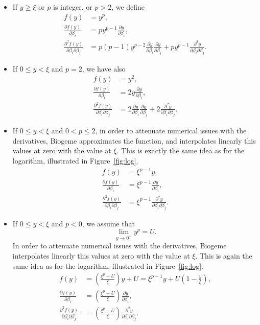 \documentclass[12pt,a4paper]{article}
\begin{document}
\begin{description}
\begin{itemize}
\item If $y \geq \xi$ or $p$ is integer, or $p > 2$, we define
      \begin{align*}
    f(y)& = y^p, \\ 
    \frac{\partial f(y)}{\partial \beta_i} &= p y^{p-1} \frac{\partial y}{\partial \beta_i}, \\
    \frac{\partial^2 f(y)}{\partial \beta_i \partial \beta_j} &= p (p-1) y^{p-2} \frac{\partial y}{\partial \beta_i} \frac{\partial y}{\partial \beta_j} +  p y^{p-1} \frac{\partial^2 y}{\partial \beta_i \partial \beta_j}.
     \end{align*}
\item If $0 \leq y < \xi$ and $p = 2$, we have also
      \begin{align*}
    f(y)& = y^2, \\ 
    \frac{\partial f(y)}{\partial \beta_i} &= 2 y \frac{\partial y}{\partial \beta_i}, \\
    \frac{\partial^2 f(y)}{\partial \beta_i \partial \beta_j} &= 2  \frac{\partial y}{\partial \beta_i} \frac{\partial y}{\partial \beta_j} +  2 \frac{\partial^2 y}{\partial \beta_i \partial \beta_j}.
    \end{align*}
\item If $0 \leq y < \xi$ and $0 < p  \leq 2$, in order to attenuate numerical issues with the derivatives, Biogeme approximates the function, and interpolates linearly this values at zero with the value at  $\xi$.
This is exactly the same idea as for the logarithm,  illustrated in Figure~\vref{fig:log}.
      \begin{align*}
    f(y)& = \xi^{p-1} y, \\ 
    \frac{\partial f(y)}{\partial \beta_i} &= \xi^{p-1} \frac{\partial y}{\partial \beta_i}, \\
    \frac{\partial^2 f(y)}{\partial \beta_i \partial \beta_j} &= \xi^{p-1} \frac{\partial^2 y}{\partial \beta_i \partial \beta_j}.
    \end{align*}
    \item If $0 \leq y < \xi$ and $p < 0$, we assume that
  \[
   \lim_{y \to 0^+} y^p = U.
  \]
   In order to attenuate numerical issues with the derivatives, Biogeme interpolates linearly this values at zero with the value at  $\xi$.
This is again the same idea as for the logarithm,  illustrated in Figure~\vref{fig:log}.
      \begin{align*}
    f(y)& = \left( \frac{\xi^p - U}{\xi} \right) y + U = \xi^{p-1} y + U \left(1 - \frac{y}{\xi}\right),\\ 
    \frac{\partial f(y)}{\partial \beta_i} &=  \left( \frac{\xi^p - U}{\xi} \right) \frac{\partial y }{\partial \beta_i}, \\
    \frac{\partial^2 f(y)}{\partial \beta_i \partial \beta_j} &=  \left( \frac{\xi^p - U}{\xi} \right) \frac{\partial^2 y }{\partial \beta_i\partial \beta_j}.
    \end{align*}

\end{itemize}


\end{description}
  
\end{document}
